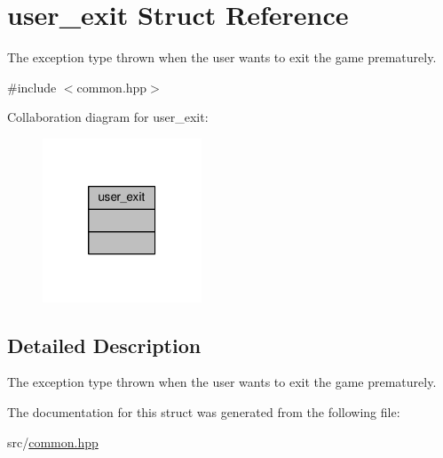 \hypertarget{structuser__exit}{\section{user\-\_\-exit Struct Reference}
\label{structuser__exit}
}


The exception type thrown when the user wants to exit the game prematurely.  




{\ttfamily \#include $<$common.\-hpp$>$}



Collaboration diagram for user\-\_\-exit\-:
\nopagebreak
\begin{figure}[H]
\begin{center}
\leavevmode
\includegraphics[width=134pt]{structuser__exit__coll__graph}
\end{center}
\end{figure}


\subsection{Detailed Description}
The exception type thrown when the user wants to exit the game prematurely. 

The documentation for this struct was generated from the following file\-:\begin{DoxyCompactItemize}
\item 
src/\hyperlink{common_8hpp}{common.\-hpp}\end{DoxyCompactItemize}
